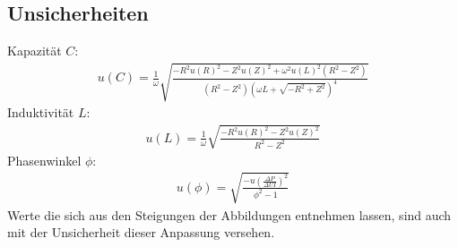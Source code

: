 \subsection{Unsicherheiten}\label{kap:Unsich}
Kapazität $C$:
\begin{align*}
	u(C)=\frac{1}{\omega} \sqrt{\frac{- R^{2} u(R)^{2} - Z^{2} u(Z)^{2} + \omega^2 u(L)^{2} \left(R^{2} - Z^{2}\right)}{\left(R^{2} - Z^{2}\right) \left(\omega L + \sqrt{- R^{2} + Z^{2}}\right)^{4}}}	
\end{align*}
Induktivität $L$:
\begin{align*}
	u(L)=\frac{1}{\omega} \sqrt{\frac{- R^{2} u(R)^{2} - Z^{2} u(Z)^{2}}{R^{2} - Z^{2}}}
\end{align*}
Phasenwinkel $\phi$: 
\begin{align*}
	u(\phi)=\sqrt{\frac{-u\left(\frac{\Delta P}{\Delta UI}\right)^2}{\phi^2-1}}
\end{align*}
Werte die sich aus  den Steigungen der Abbildungen entnehmen lassen, sind auch mit der Unsicherheit dieser Anpassung versehen.